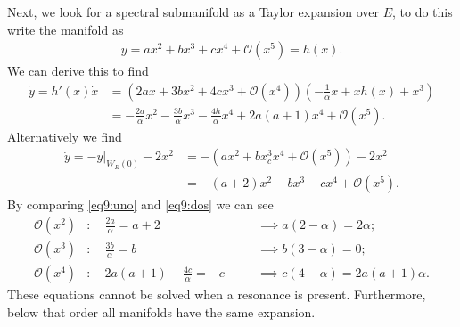\begin{ex}[]
	Next, we look for a spectral submanifold as a Taylor expansion over $E$, to do this write the manifold as
	\begin{align}
		y = ax^2 + bx^3 + cx^4 + \mathcal{O}(x^5) = h(x).
	\end{align}
	We can derive this to find
	\begin{align} 
		\dot{y} = h'(x)\dot{x} &= \left(2ax + 3bx^2 + 4cx^3 + \mathcal{O}(x^4)\right) \left( - \frac{1}{\alpha } x + xh(x) + x^3 \right) \\
				       &= -\frac{2a}{\alpha } x^2 - \frac{3b}{\alpha }x^3 - \frac{4h}{\alpha }x^4 + 2a(a+1) x^4 + \mathcal{O}(x^5). \label{eq9:uno} 
       \end{align}
       Alternatively we find
       \begin{align}
		\dot{y} =\left. -y \right|_{W_E(0)} - 2x^2 &= -\left(ax^2 + bx^3 _ cx^4 + \mathcal{O}(x^5)\right) - 2x^2\\
							   &= -(a+2)x^2 - bx^3 - cx^4 + \mathcal{O}(x^5). \label{eq9:dos}
	\end{align}
	By comparing \ref{eq9:uno} and \ref{eq9:dos} we can see
	\begin{align}
		\mathcal{O}(x^2)&:\quad \frac{2a}{\alpha } = a+2 \quad &&\implies a(2-\alpha ) = 2\alpha; \\ 
		\mathcal{O}(x^3)&:\quad \frac{3b}{\alpha } = b \quad &&\implies b(3-\alpha ) = 0;\\
		\mathcal{O}(x^4)&:\quad 2a(a+1)- \frac{4c}{\alpha }= -c \quad &&\implies c(4-\alpha )= 2a(a+1)\alpha .
	\end{align}
These equations cannot be solved when a resonance is present. Furthermore, below that order all manifolds have the same expansion.


\end{ex}
